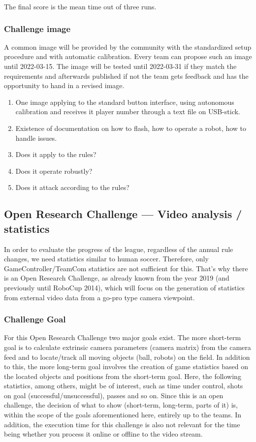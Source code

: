         The final score is the mean time out of three runs.

    \subsubsection{Challenge image}
        \label{sec:Challenge_image}
        A common image will be provided by the community with the standardized setup procedure and with automatic calibration. Every team can propose such an image until 2022-03-15. The image will be tested until 2022-03-31 if they match the requirements and afterwards published if not the team gets feedback and has the opportunity to hand in a revised image.

        \begin{enumerate}
            \item One image applying to the standard button interface, using autonomous calibration and receives it player number through a text file on USB-stick.
            \item Existence of documentation on how to flash, how to operate a robot, how to handle issues.
            \item Does it apply to the rules?
            \item Does it operate robustly?
            \item Does it attack according to the rules?
        \end{enumerate}

\newpage

\subsection{Open Research Challenge — Video analysis / statistics}
In order to evaluate the progress of the league, regardless of the annual rule changes, we need statistics similar to human soccer. Therefore, only GameController/TeamCom statistics are not sufficient for this. That's why there is an Open Research Challenge, as already known from the year 2019 (and previously until RoboCup 2014), which will focus on the generation of statistics from external video data from a go-pro type camera viewpoint.

    \subsubsection{Challenge Goal}
    For this Open Research Challenge two major goals exist. The more short-term goal is to calculate extrinsic camera parameters (camera matrix) from the camera feed and to locate/track all moving objects (ball, robots) on the field. In addition to this, the more long-term goal involves the creation of game statistics based on the located objects and positions from the short-term goal. Here, the following statistics, among others, might be of interest, such as time under control, shots on goal (successful/unsuccessful), passes and so on. Since this is an open challenge, the decision of what to show (short-term, long-term, parts of it) is, within the scope of the goals aforementioned here, entirely up to the teams. In addition, the execution time for this challenge is also not relevant for the time being whether you process it online or offline to the video stream.

